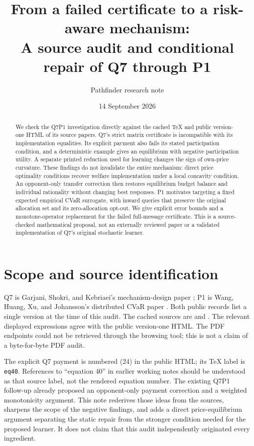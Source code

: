 \documentclass[11pt,a4paper]{article}
\title{From a failed certificate to a risk-aware mechanism:\\
A source audit and conditional repair of Q7 through P1}
\author{Pathfinder research note}
\date{14 September 2026}
\begin{document}
\maketitle

\begin{abstract}
We check the Q7P1 investigation directly against the cached TeX and public
version-one HTML of its source papers. Q7's strict matrix certificate is
incompatible with its implementation equalities. Its explicit payment also
fails its stated participation condition, and a deterministic example gives
an equilibrium with negative participation utility. A separate printed
reduction used for learning changes the sign of own-price curvature. These
findings do not invalidate the entire mechanism: direct price optimality
conditions recover welfare implementation under a local concavity condition.
An opponent-only transfer correction then restores equilibrium budget balance
and individual rationality without changing best responses. P1 motivates
targeting a fixed expected empirical CVaR surrogate, with inward queries that
preserve the original allocation set and its zero-allocation opt-out. We give
explicit error bounds and a monotone-operator replacement for the failed
full-message certificate. This is a source-checked mathematical proposal,
not an externally reviewed paper or a validated implementation of Q7's
original stochastic learner.
\end{abstract}

\section{Scope and source identification}

Q7 is Garjani, Shokri, and Kebriaei's mechanism-design paper
\cite{q7}; P1 is Wang, Huang, Xu, and Johansson's distributed CVaR paper
\cite{p1}. Both public records list a single version at the time of this
audit. The cached sources are  and
. The relevant displayed expressions agree
with the public version-one HTML. The PDF endpoints could not be retrieved
through the browsing tool; this is not a claim of a byte-for-byte PDF audit.

The explicit Q7 payment is numbered (24) in the public HTML; its TeX label
is \texttt{eq40}. References to ``equation 40'' in earlier working notes
should be understood as that source label, not the rendered equation number.
The existing Q7P1 follow-up already proposed an opponent-only payment
correction and a weighted monotonicity argument. This note rederives those
ideas from the sources, sharpens the scope of the negative findings, and
adds a direct price-equilibrium argument separating the static repair from
the stronger condition needed for the proposed learner. It does not claim
that this audit independently originated every ingredient.
\end{document}
